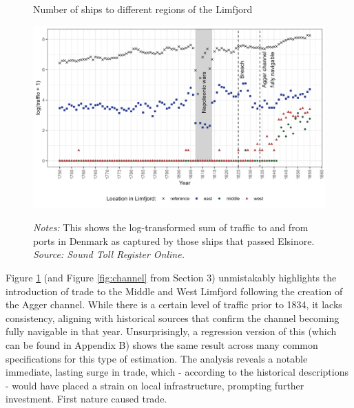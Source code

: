 \documentclass[11pt]{article}
\begin{document}
\begin{figure}
\begin{center}
  \caption{Number of ships to different regions of the Limfjord} \label{fig:Sound_toll}
  \includegraphics[width=1\textwidth]{Plots/Ship_trafic.png}
  \parbox{0.9\textwidth}{
  \caption*{\footnotesize \textit{Notes:} This shows the log-transformed sum of traffic to and from ports in Denmark as captured by those ships that passed Elsinore. \\ \textit{Source: Sound Toll Register Online.}}
}
\end{center}
\end{figure}

Figure \ref{fig:Sound_toll} (and Figure \ref{fig:channel} from Section 3) unmistakably highlights the introduction of trade to the Middle and West Limfjord following the creation of the Agger channel. While there is a certain level of traffic prior to 1834, it lacks consistency, aligning with historical sources that confirm the channel becoming fully navigable in that year. Unsurprisingly, a regression version of this (which can be found in Appendix B) shows the same result across many common specifications for this type of estimation. The analysis reveals a notable immediate, lasting surge in trade, which - according to the historical descriptions - would have placed a strain on local infrastructure, prompting further investment. First nature caused trade.

\end{document}
